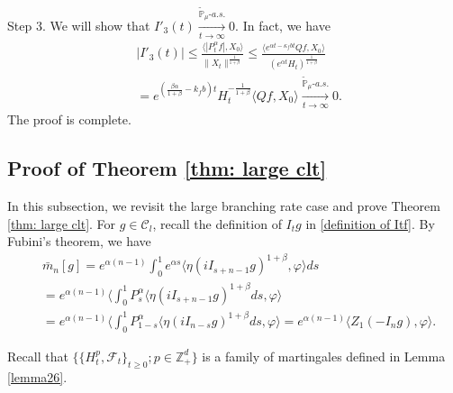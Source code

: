 \documentclass[12pt,a4paper]{amsart}
\theoremstyle{plain}
\theoremstyle{definition}
\numberwithin{equation}{section}
\begin{document}
	Step 3. We will show that $I'_3(t) \xrightarrow[t\to \infty]{\tilde {\mathbb P}_\mu \text{-} a.s.} 0$.
    In fact, we have
\begin{equation}\begin{split}
	&|I'_3(t)|
     \leq \frac{\langle |P^\alpha_tf|,X_0\rangle}{\|X_t\|^{\frac{1}{1+\beta}}}
	\leq \frac{\langle e^{\alpha t - \kappa_f b t}Qf,X_0\rangle}{(e^{\alpha t} H_t)^{\frac{1}{1+\beta}}}
	\\& = e^{(\frac{\beta \alpha }{1+\beta} - k_fb)t} H_t^{-\frac{1}{1+\beta}} \langle Qf,X_0\rangle
	\xrightarrow[t\to \infty]{\tilde {\mathbb P}_\mu \text{-} a.s.} 0.
\end{split}\end{equation}
	The proof is complete.
\subsection{Proof of Theorem \ref{thm: large clt}}\label{large rate again}
    In this subsection, we revisit the large branching rate case and prove Theorem \ref{thm: large clt}.
    For $g\in \mathcal{C}_l$, recall the definition of $I_tg$ in \eqref{definition of Itf}.
    By Fubini's theorem, we have
\begin{align}\label{equ: transform of mn}
    &\bar{m}_n[g]=e^{\alpha(n-1)}\int_0^1 e^{\alpha s}\langle \eta(iI_{s+n-1}g)^{1+\beta}, \varphi\rangle ds\\
    &=e^{\alpha(n-1)}\langle \int_0^1 P_s^{\alpha}\langle \eta(iI_{s+n-1}g)^{1+\beta}ds, \varphi\rangle\\
    &=e^{\alpha(n-1)}\langle \int_0^1 P_{1-s}^{\alpha}\langle \eta(iI_{n-s}g)^{1+\beta}ds, \varphi\rangle=e^{\alpha(n-1)}\langle Z_1(-I_ng), \varphi\rangle.
\end{align}

    Recall that $\Big\{\{H^p_t, \mathscr{F}_t\}_{t\geq 0};p\in \mathbb{Z}_+^d\Big\}$ is a family of martingales defined in Lemma \ref{lemma26}.
\end{document}
